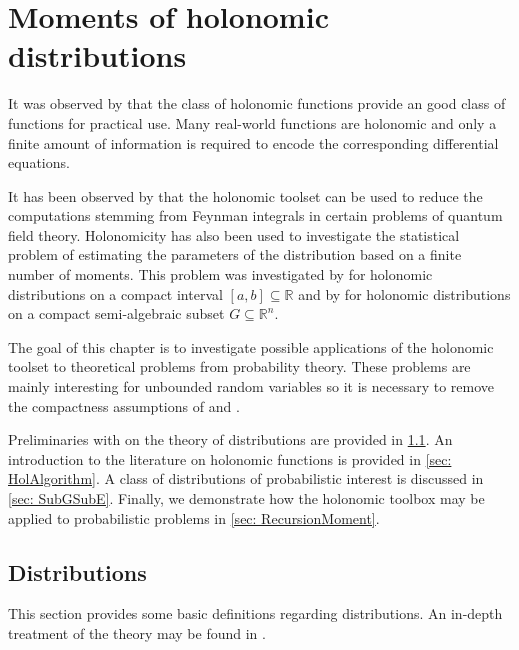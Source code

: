 \chapter{Moments of holonomic distributions}
It was observed by \cite{zeilberger1990holonomic} that the class of holonomic functions provide an good class of functions for practical use.
Many real-world functions are holonomic and only a finite amount of information is required to encode the corresponding differential equations.

It has been observed by \cite{bitoun2019feynman} that the holonomic toolset can be used to reduce the computations stemming from Feynman integrals in certain problems of quantum field theory.
Holonomicity has also been used to investigate the statistical problem of estimating the parameters of the distribution based on a finite number of moments.
This problem was investigated by \cite{batenkov2009moment} for holonomic distributions on a compact interval $[a,b]\subseteq \mathbb{R}$ and by \cite{brehard2019moment} for holonomic distributions on a compact semi-algebraic subset $G\subseteq \mathbb{R}^n$.

The goal of this chapter is to investigate possible applications of the holonomic toolset to theoretical problems from probability theory.
These problems are mainly interesting for unbounded random variables so it is necessary to remove the compactness assumptions of \cite{batenkov2009moment} and \cite{brehard2019moment}.

Preliminaries with on the theory of distributions are provided in \cref{sec: Distributions}.
An introduction to the literature on holonomic functions is provided in \cref{sec: HolAlgorithm}.
A class of distributions of probabilistic interest is discussed in \cref{sec: SubGSubE}.
Finally, we demonstrate how the holonomic toolbox may be applied to probabilistic problems in \cref{sec: RecursionMoment}.
\section{Distributions}\label{sec: Distributions}
This section provides some basic definitions regarding distributions.
An in-depth treatment of the theory may be found in \cite{grubb2008distributions}.


